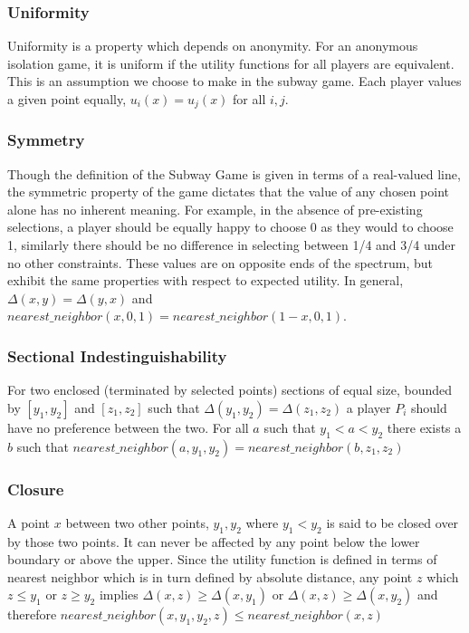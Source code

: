\documentclass{acm_proc_article-sp}
\begin{document}
\subsubsection{Uniformity}
Uniformity is a property which depends on anonymity. For an anonymous isolation game, it is uniform if the utility functions for all players are equivalent\cite{zhao2008isolation}. This is an assumption we choose to make in the subway game. Each player values a given point equally, $u_i(x) = u_j(x)$ for all $i, j$.

\subsubsection{Symmetry}
Though the definition of the Subway Game is given in terms of a real-valued line, the symmetric property of the game dictates that the value of any chosen point alone has no inherent meaning. For example, in the absence of pre-existing selections, a player should be equally happy to choose 0 as they would to choose 1, similarly there should be no difference in selecting between 1/4 and 3/4 under no other constraints. These values are on opposite ends of the spectrum, but exhibit the same properties with respect to expected utility. In general, $\Delta(x, y) = \Delta(y, x)$ and $nearest\_neighbor(x, 0, 1) = nearest\_neighbor(1 - x, 0, 1)$.

\subsubsection{Sectional Indestinguishability}
For two enclosed (terminated by selected points) sections of equal size, bounded by $[y_1, y_2]$ and $[z_1, z_2]$ such that $\Delta(y_1, y_2) = \Delta(z_1, z_2)$ a player $P_i$ should have no preference between the two. For all $a$ such that $y_1 < a < y_2$ there exists a $b$ such that $nearest\_neighbor(a, y_1, y_2) = nearest\_neighbor(b, z_1, z_2)$

\subsubsection{Closure}
A point $x$ between two other points, $y_1, y_2$ where $y_1 < y_2$ is said to be closed over by those two points. It can never be affected by any point below the lower boundary or above the upper. Since the utility function is defined in terms of nearest neighbor which is in turn defined by absolute distance, any point $z$ which $z \leq y_1$ or $z \geq y_2$ implies $\Delta(x, z) \geq \Delta(x, y_1)$ or $\Delta(x, z) \geq \Delta(x, y_2)$ and therefore $nearest\_neighbor(x, y_1, y_2, z) \leq nearest\_neighbor(x, z)$
\end{document}

